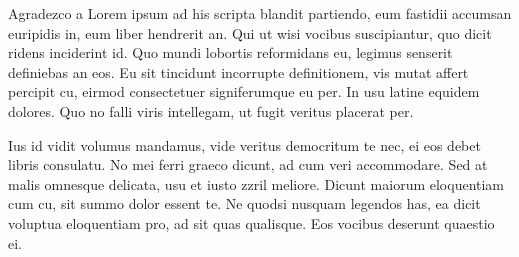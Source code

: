 \def\baselinestretch{1.0}

Agradezco a Lorem ipsum ad his scripta blandit partiendo, eum fastidii accumsan euripidis in, eum liber hendrerit an. Qui ut wisi vocibus suscipiantur, quo dicit ridens inciderint id. Quo mundi lobortis reformidans eu, legimus senserit definiebas an eos. Eu sit tincidunt incorrupte definitionem, vis mutat affert percipit cu, eirmod consectetuer signiferumque eu per. In usu latine equidem dolores. Quo no falli viris intellegam, ut fugit veritus placerat per.

Ius id vidit volumus mandamus, vide veritus democritum te nec, ei eos debet libris consulatu. No mei ferri graeco dicunt, ad cum veri accommodare. Sed at malis omnesque delicata, usu et iusto zzril meliore. Dicunt maiorum eloquentiam cum cu, sit summo dolor essent te. Ne quodsi nusquam legendos has, ea dicit voluptua eloquentiam pro, ad sit quas qualisque. Eos vocibus deserunt quaestio ei. 


